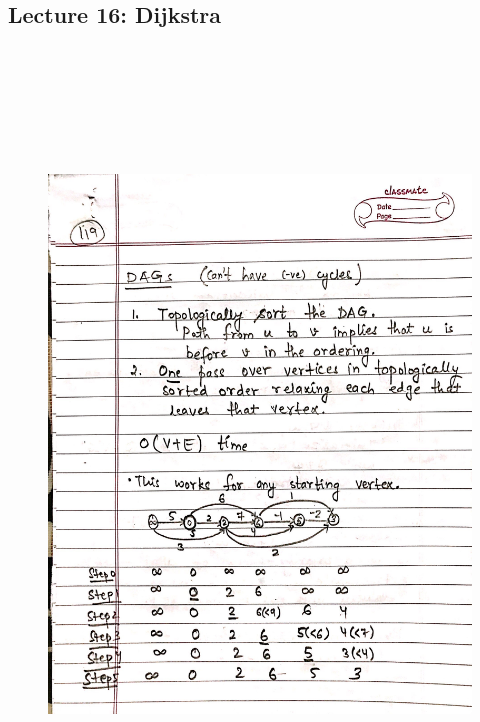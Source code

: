 \newpage
{\color{black} \subsection*{Lecture 16: Dijkstra}}
\begin{figure}[H]
    \centering
    \includegraphics[width=16cm, height=21cm]{"./MIT-6.006/MIT-6006-119"}
\end{figure}

